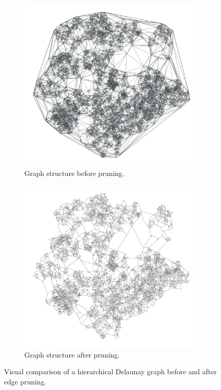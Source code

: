 \begin{figure}[tbhp]
	\centering
	\begin{subfigure}{0.45\linewidth}
		\centering
		\includegraphics[width=\linewidth]{graphics/delaunay_pre_prune.png}
		\caption{Graph structure before pruning.}
		\label{fig:delaunay_pre_prune_viz}
	\end{subfigure}
	\hfill
	\begin{subfigure}{0.45\linewidth}
		\centering
		\includegraphics[width=\linewidth]{graphics/delaunay_post_prune.png}
		\caption{Graph structure after pruning.}
		\label{fig:delaunay_post_prune_viz}
	\end{subfigure}
	\caption{Visual comparison of a hierarchical Delaunay graph before and after edge pruning.}
	\label{fig:delaunay_vs_no_pruning_graph}
\end{figure}

